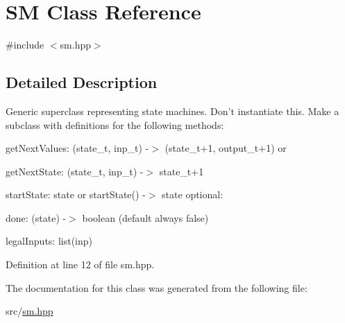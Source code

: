 \hypertarget{class_s_m}{
\section{SM Class Reference}
\label{d3/d61/class_s_m}
}


{\ttfamily \#include $<$sm.hpp$>$}



\subsection{Detailed Description}
Generic superclass representing state machines. Don't instantiate this. Make a subclass with definitions for the following methods:
\begin{DoxyItemize}
\item getNextValues: (state\_\-t, inp\_\-t) -\/$>$ (state\_\-t+1, output\_\-t+1) or
\begin{DoxyItemize}
\item getNextState: (state\_\-t, inp\_\-t) -\/$>$ state\_\-t+1
\end{DoxyItemize}
\item startState: state or startState() -\/$>$ state optional:
\item done: (state) -\/$>$ boolean (default always false)
\item legalInputs: list(inp) 
\end{DoxyItemize}

Definition at line 12 of file sm.hpp.



The documentation for this class was generated from the following file:\begin{DoxyCompactItemize}
\item 
src/\hyperlink{sm_8hpp}{sm.hpp}\end{DoxyCompactItemize}
